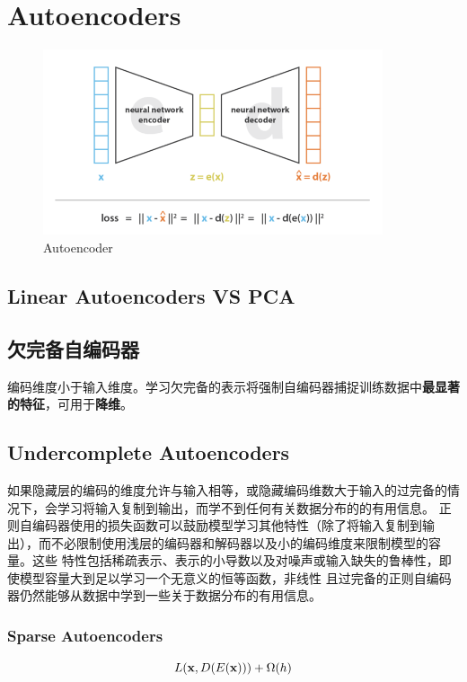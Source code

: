 \chapter{Autoencoders}

\begin{figure}[H]
    \centering
    \includegraphics[width=10cm]{images/ae.png}
    \caption{Autoencoder}
    \label{fig:autoencoder}
\end{figure}

\section{Linear Autoencoders VS PCA}


\section{欠完备自编码器}
编码维度小于输入维度。学习欠完备的表示将强制自编码器捕捉训练数据中\textbf{最显著的特征}，可用于\textbf{降维}。

\section{Undercomplete Autoencoders}
如果隐藏层的编码的维度允许与输入相等，或隐藏编码维数大于输入的过完备的情况下，会学习将输入复制到输出，而学不到任何有关数据分布的的有用信息。
正则自编码器使用的损失函数可以鼓励模型学习其他特性（除了将输入复制到输出），而不必限制使用浅层的编码器和解码器以及小的编码维度来限制模型的容量。这些
特性包括稀疏表示、表示的小导数以及对噪声或输入缺失的鲁棒性，即使模型容量大到足以学习一个无意义的恒等函数，非线性
且过完备的正则自编码器仍然能够从数据中学到一些关于数据分布的有用信息。

\subsection{Sparse Autoencoders}
\begin{equation}
    L(\mathbf{x}, D(E(\mathbf{x}))) + \Omega (h)
\end{equation}


